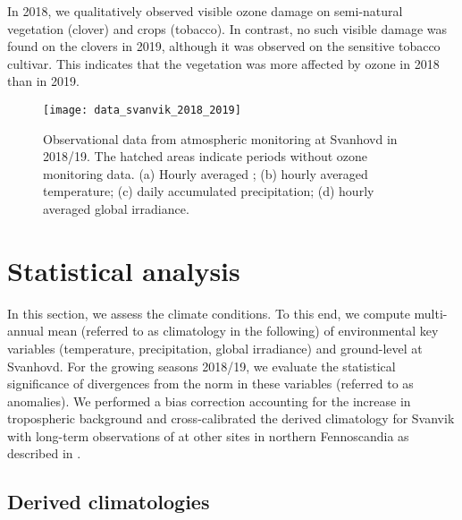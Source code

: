 \documentclass[bg, manuscript]{copernicus}
\begin{document}
In 2018, we qualitatively observed visible ozone damage on semi-natural vegetation (clover) and crops (tobacco). In contrast, no such visible damage was found on the clovers in 2019, although it was observed on the sensitive tobacco cultivar. This indicates that the vegetation was more affected by ozone in 2018 than in 2019.

\begin{figure*}[t]
  \texttt{[image: data\_svanvik\_2018\_2019]}
  \caption{Observational data from atmospheric monitoring at Svanhovd in 2018/19. The hatched areas indicate periods without ozone monitoring data. (a) Hourly averaged \chem{[O_3]}; (b) hourly averaged temperature; (c) daily accumulated precipitation; (d) hourly averaged global irradiance.}
  \label{fig:data_svanvik_2018_2019}
\end{figure*}

\section{Statistical analysis}
\label{sec:stats}
In this section, we assess the climate conditions. To this end, we compute multi-annual mean (referred to as climatology in the following) of environmental key variables (temperature, precipitation, global irradiance) and ground-level \chem{[O_3]} at Svanhovd. For the growing seasons 2018/19, we evaluate the statistical significance of divergences from the norm in these variables (referred to as anomalies). We performed a bias correction accounting for the increase in tropospheric background \chem{[O_3]} and cross-calibrated the derived climatology for Svanvik with long-term observations of \chem{[O_3]} at other sites in northern Fennoscandia as described in \citet{ACPD:Falk2021}.

\subsection{Derived climatologies}
\label{subsec:climatologies}
\end{document}

